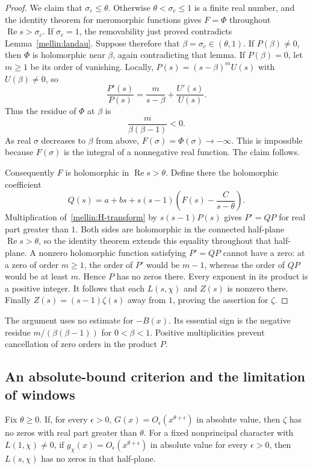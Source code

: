 \begin{proof}
We claim that $\sigma_c\leq\theta$.  Otherwise
$\theta<\sigma_c\leq1$ is a finite real number, and the identity theorem
for meromorphic functions gives $F=\Phi$ throughout
$\operatorname{Re}s>\sigma_c$.  If $\sigma_c=1$, the removability just
proved contradicts Lemma~\ref{mellin:landau}.
Suppose therefore that $\beta=\sigma_c\in(\theta,1)$.
If $P(\beta)\neq0$, then $\Phi$ is holomorphic near $\beta$, again
contradicting that lemma.
If $P(\beta)=0$, let $m\geq1$ be its order of vanishing.  Locally,
$P(s)=(s-\beta)^mU(s)$ with $U(\beta)\neq0$, so
\[
 \frac{P'(s)}{P(s)}=\frac m{s-\beta}+\frac{U'(s)}{U(s)}.
\]
Thus the residue of $\Phi$ at $\beta$ is
\[
 \frac{m}{\beta(\beta-1)}<0.
\]
As real $\sigma$ decreases to $\beta$ from above,
$F(\sigma)=\Phi(\sigma)\to-\infty$.  This is impossible because
$F(\sigma)$ is the integral of a nonnegative real function.
The claim follows.

Consequently $F$ is holomorphic in $\operatorname{Re}s>\theta$.
Define there the holomorphic coefficient
\[
 Q(s)=a+bs+s(s-1)\left(F(s)-\frac C{s-\theta}\right).
\]
Multiplication of~\eqref{mellin:H-transform} by $s(s-1)P(s)$ gives
$P'=QP$ for real part greater than $1$.  Both sides are holomorphic
in the connected half-plane $\operatorname{Re}s>\theta$, so the
identity theorem extends this equality throughout that half-plane.
A nonzero holomorphic function satisfying $P'=QP$ cannot have a zero:
at a zero of order $m\geq1$, the order of $P'$ would be $m-1$, whereas
the order of $QP$ would be at least $m$.  Hence $P$ has no zeros there.
Every exponent in its product is a positive integer.  It follows that
each $L(s,\chi)$ and $Z(s)$ is nonzero there.  Finally
$Z(s)=(s-1)\zeta(s)$ away from $1$, proving the assertion for $\zeta$.
\end{proof}

The argument uses no estimate for $-B(x)$.
Its essential sign is the negative residue
$m/(\beta(\beta-1))$ for $0<\beta<1$.  Positive multiplicities prevent
cancellation of zero orders in the product $P$.

\subsection{An absolute-bound criterion and the limitation of windows}

\begin{corollary}\label{mellin:absolute}
Fix $\theta\geq0$.  If, for every $\epsilon>0$,
$G(x)=O_\epsilon(x^{\theta+\epsilon})$ in absolute value, then
$\zeta$ has no zeros with real part greater than $\theta$.
For a fixed nonprincipal character with $L(1,\chi)\neq0$, if
$g_\chi(x)=O_\epsilon(x^{\theta+\epsilon})$ in absolute value for
every $\epsilon>0$, then $L(s,\chi)$ has no zeros in that half-plane.
\end{corollary}

